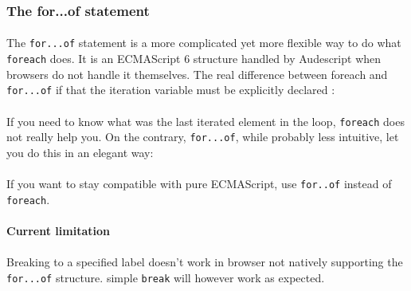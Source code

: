 \documentclass{article}
\let\subsubsubsection\paragraph
\begin{document}
\begin{sloppypar}
\begin{itemize}
{               {}
            }
\end{itemize}

      

      

\subsubsection{ The for...of statement}


\paragraph{}
The \verb!for...of! statement is a more complicated yet more flexible way to do what \verb!foreach! does. It is an ECMAScript 6 structure handled by Audescript when browsers do not handle it themselves.
         The real difference between foreach and \verb!for...of! if that the iteration variable must be explicitly declared :
         {}

         
\paragraph{}
If you need to know what was the last iterated element in the loop, \verb!foreach! does not really help you. On the contrary, \verb!for...of!, while probably less intuitive, let you do this in an elegant way:

         {}

         
\paragraph{}
If you want to stay compatible with pure ECMAScript, use \verb!for..of! instead of \verb!foreach!.

         

\subsubsubsection{ Current limitation\\}
\paragraph{}
Breaking to a specified label doesn't work in browser not natively supporting the \verb!for...of! structure. simple \verb!break! will however work as expected.
         


\end{sloppypar}
\end{document}
